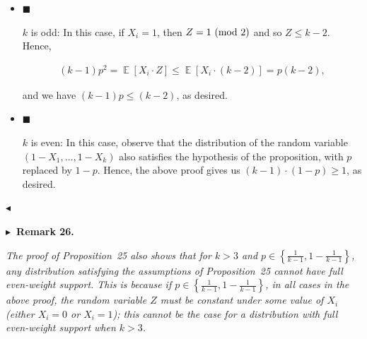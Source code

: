 \begin{itemize}


\item[] 
$\blacksquare$ 


$k$ is odd: In this case, if $X_{i}=1$, then $Z=1\textnormal{ (mod 2)}$ and so $Z\leqslant k-2$. Hence,\par


\[\begin{gathered}
(k-1)p^{2}=\mathop{\mathbb{E}}\left[X_{i}\cdot Z\right]\leqslant\mathop{\mathbb{E}}\left[X_{i}\cdot(k-2)\right]=p(k-2),
\end{gathered}\]


and we have $(k-1)p\leqslant(k-2)$, as desired.\par





\item[] 
$\blacksquare$ 


$k$ is even: In this case, observe that the distribution of the random variable $(1-X_{1},\dots,1-X_{k})$ also satisfies the hypothesis of the proposition, with $p$ replaced by $1-p$. Hence, the above proof gives us $(k-1)\cdot(1-p)\geqslant 1$, as desired.\par





\end{itemize}


$\blacktriangleleft$\par





\par\medskip\noindent\textbf{
$\blacktriangleright$ Remark 26.
}\par



\emph{The proof of Proposition 25 also shows that for $k>3$ and $p\in\left\{\frac{1}{k-1},1-\frac{1}{k-1}\right\}$, any distribution satisfying the assumptions of Proposition 25 cannot have full even-weight support.
This is because if $p\in\left\{\frac{1}{k-1},1-\frac{1}{k-1}\right\}$, in all cases in the above proof, the random variable $Z$ must be constant under some value of $X_{i}$ (either $X_{i}=0$ or $X_{i}=1$); this cannot be the case for a distribution with full even-weight support when $k>3$.}\par



